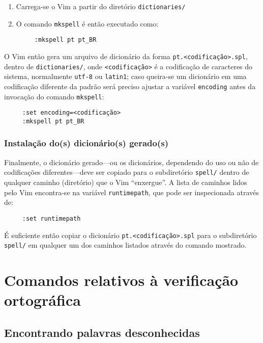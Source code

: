 \begin{enumerate}
\item Carrega-se o Vim a partir do diretório {\tt dictionaries/}
\item O comando {\tt mkspell} é então executado como:
\begin{verbatim}
     :mkspell pt pt_BR
\end{verbatim}
\end{enumerate}

O Vim então gera um arquivo de dicionário da forma
\verb|pt.<codificação>.spl|, dentro de {\tt dictionaries/}, onde
\verb|<codificação>| é a codificação de caracteres do sistema, normalmente
\verb|utf-8| ou \verb|latin1|; caso queira-se um dicionário em uma codificação
diferente da padrão será preciso ajustar a variável {\tt encoding} antes da
invocação do comando {\tt mkspell}:

\begin{verbatim}
     :set encoding=<codificação>
     :mkspell pt pt_BR
\end{verbatim}

\subsubsection{Instalação do(s) dicionário(s) gerado(s)}

Finalmente, o dicionário gerado---ou os dicionários, dependendo do uso ou não
de codificações diferentes---deve ser copiado para o subdiretório {\tt spell/}
dentro de qualquer caminho (diretório) que o Vim ``enxergue''. A lista de
caminhos lidos pelo Vim encontra-se na variável {\tt runtimepath}, que pode
ser inspecionada através de:

\begin{verbatim}
     :set runtimepath
\end{verbatim}

É suficiente então copiar o dicionário \verb|pt.<codificação>.spl| para o
subdiretório {\tt spell/} em qualquer um dos caminhos listados através do
comando mostrado. 

\section{Comandos relativos à verificação ortográfica}

\subsection{Encontrando palavras desconhecidas}

